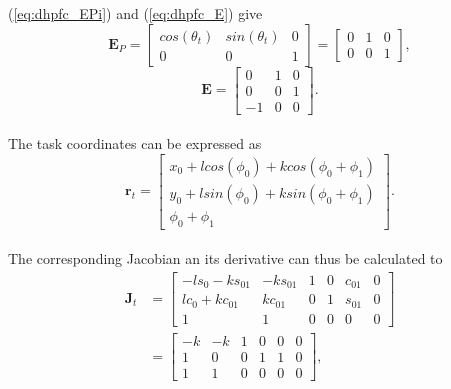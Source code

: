 (\ref{eq:dhpfc_EPi}) and (\ref{eq:dhpfc_E}) give
\begin{equation}
    \mathbf{E}_P = 
    \begin{bmatrix}
        cos(\theta_t) & sin(\theta_t) & 0 \\
        0 & 0 & 1
    \end{bmatrix}=
    \begin{bmatrix}
        0 & 1 & 0 \\
        0 & 0 & 1
    \end{bmatrix},
\end{equation}
\begin{equation}
    \mathbf{E}=
    \begin{bmatrix}
        0 & 1 & 0 \\
        0 & 0 & 1 \\
        -1 & 0 & 0
    \end{bmatrix}.
\end{equation}
\\
The task coordinates can be expressed as
\begin{equation}
    \mathbf{r}_t =
    \begin{bmatrix}
        x_0 + l cos(\phi_0) + k cos(\phi_0+\phi_1)\\
        y_0 + l sin(\phi_0) + k sin(\phi_0+\phi_1)\\
        \phi_0+\phi_1
    \end{bmatrix}.
\end{equation}
\\
The corresponding Jacobian an its derivative can thus be calculated to
\begin{equation}
    \begin{split}
        \mathbf{J}_t&=
        \begin{bmatrix}
            -l s_0 - k s_{01} & - k s_{01} & 1 & 0 & c_{01} & 0 \\
            l c_0 + k c_{01} & k c_{01} & 0 & 1 & s_{01} & 0 \\
            1 & 1 & 0 & 0 & 0 & 0
        \end{bmatrix}\\&=
        \begin{bmatrix}
            - k & - k & 1 & 0 & 0 & 0 \\
            1 &0 & 0 & 1 & 1 & 0 \\
            1 & 1 & 0 & 0 & 0 & 0
        \end{bmatrix},
    \end{split}
\end{equation}
